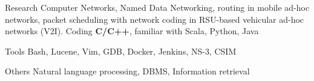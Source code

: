 
\begin{cvskills}

  \cvskill
    {Research} %
    {Computer Networks, Named Data Networking, routing in mobile ad-hoc networks, packet scheduling with network coding in RSU-based vehicular ad-hoc networks (V2I).} %
  \cvskill
    {Coding} %
    {\textbf{C/C++}, familiar with Scala, Python, Java} %

 \cvskill
   {Tools} %
   {Bash, Lucene, Vim, GDB, Docker, Jenkins, NS-3, CSIM} %

 \cvskill
   {Others} %
   {Natural language processing, DBMS, Information retrieval} %

\end{cvskills}
